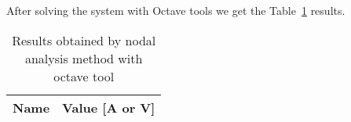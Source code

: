 After solving the system with Octave tools we get the Table~\ref{tab:nodal} results.

\begin{table}[h]
  \centering
  \begin{tabular}{|l|r|}
    \hline    
    {\bf Name} & {\bf Value [A or V]} \\ \hline
    
  \end{tabular}
  \caption{Results obtained by nodal analysis method with octave tool}
  \label{tab:nodal}
\end{table}

\lipsum[1-1]


